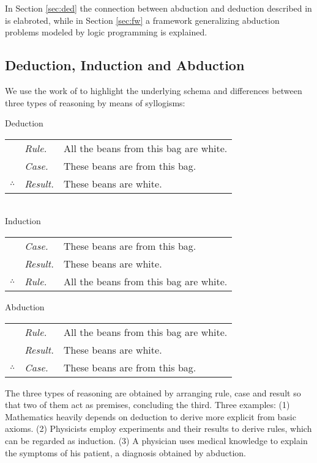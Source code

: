 \documentclass[a4paper]{article}
\begin{document}
In Section \ref{sec:ded} the connection between abduction and deduction described in \cite{DBLP:journals/logcom/ConsoleDT91} is elabroted, while in Section \ref{sec:fw} a framework generalizing abduction problems modeled by logic programming \cite{DBLP:journals/tcs/EiterGL97} is explained.

\subsection{Deduction, Induction and Abduction}

We use the work of \citet{dih} to highlight the underlying schema and differences between three types of reasoning by means of syllogisms:

\begin{center}
Deduction\\[2mm]
\begin{tabular}{cll}
             & \emph{Rule.}   & All the beans from this bag are white.\\
             & \emph{Case.}   & These beans are from this bag.\\
$\therefore$ & \emph{Result.} & These beans are white.
\end{tabular}\\[4mm]

Induction\\[2mm]
\begin{tabular}{cll}
             & \emph{Case.}   & These beans are from this bag.\\
             & \emph{Result.} & These beans are white.\\
$\therefore$ & \emph{Rule.}   & All the beans from this bag are white.
\end{tabular}\newpage

Abduction\\[2mm]
\begin{tabular}{cll}
             & \emph{Rule.}   & All the beans from this bag are white.\\
             & \emph{Result.} & These beans are white.\\
$\therefore$ & \emph{Case.}   & These beans are from this bag.
\end{tabular}
\end{center}

The three types of reasoning are obtained by arranging rule, case and result so that two of them act as premises, concluding the third. Three examples: (1) Mathematics heavily depends on deduction to derive more explicit from basic axioms. (2) Physicists employ experiments and their results to derive rules, which can be regarded as induction. (3) A physician uses medical knowledge to explain the symptoms of his patient, a diagnosis obtained by abduction.
\end{document}
